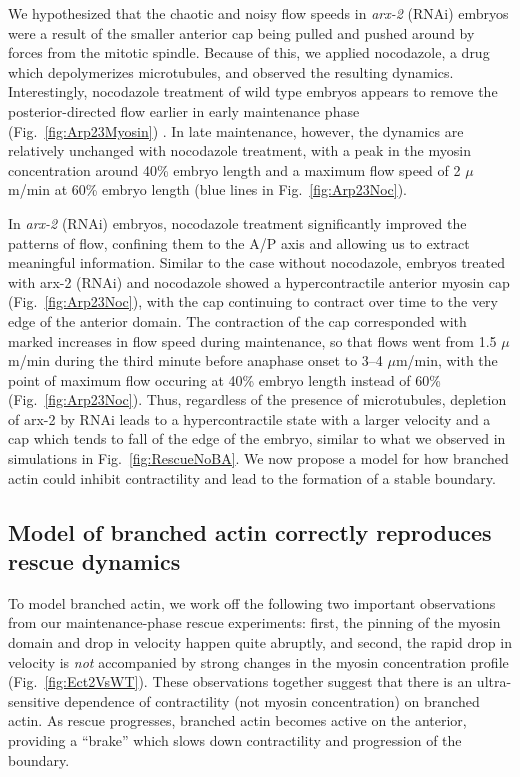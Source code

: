 \documentclass[11pt]{article}
\newcommand{\6}[1]{#1_{\text{6}}}
\newcommand{\3}[1]{#1_{\text{3}}}
\begin{document}
We hypothesized that the chaotic and noisy flow speeds in \emph{arx-2} (RNAi) embryos were a result of the smaller anterior cap being pulled and pushed around by forces from the mitotic spindle. Because of this, we applied nocodazole, a drug which depolymerizes microtubules, and observed the resulting dynamics. Interestingly, nocodazole treatment of wild type embryos appears to remove the posterior-directed flow earlier in early maintenance phase (Fig.\ \ref{fig:Arp23Myosin}) \citep{sailer2015dynamic}. In late maintenance, however, the dynamics are relatively unchanged with nocodazole treatment, with a peak in the myosin concentration around 40\% embryo length and a maximum flow speed of 2 $\mu$m/min at 60\% embryo length (blue lines in Fig.\ \ref{fig:Arp23Noc}).

In \emph{arx-2} (RNAi) embryos, nocodazole treatment significantly improved the patterns of flow, confining them to the A/P axis and allowing us to extract meaningful information. Similar to the case without nocodazole, embryos treated with arx-2 (RNAi) and nocodazole showed a hypercontractile anterior myosin cap (Fig.\ \ref{fig:Arp23Noc}), with the cap continuing to contract over time to the very edge of the anterior domain. The contraction of the cap corresponded with marked increases in flow speed during maintenance, so that flows went from 1.5 $\mu$m/min during the third minute before anaphase onset to 3--4 $\mu$m/min, with the point of maximum flow occuring at 40\% embryo length instead of 60\% (Fig.\ \ref{fig:Arp23Noc}). Thus, regardless of the presence of microtubules, depletion of arx-2 by RNAi leads to a hypercontractile state with a larger velocity and a cap which tends to fall of the edge of the embryo, similar to what we observed in simulations in Fig.\ \ref{fig:RescueNoBA}. We now propose a model for how branched actin could inhibit contractility and lead to the formation of a stable boundary.

\subsection{Model of branched actin correctly reproduces rescue dynamics}
To model branched actin, we work off the following two important observations from our maintenance-phase rescue experiments: first, the pinning of the myosin domain and drop in velocity happen quite abruptly, and second, the rapid drop in velocity is \emph{not} accompanied by strong changes in the myosin concentration profile (Fig.\ \ref{fig:Ect2VsWT}). These observations together suggest that there is an ultra-sensitive dependence of contractility (not myosin concentration) on branched actin. As rescue progresses, branched actin becomes active on the anterior, providing a ``brake'' which slows down contractility and progression of the boundary.
\end{document}
